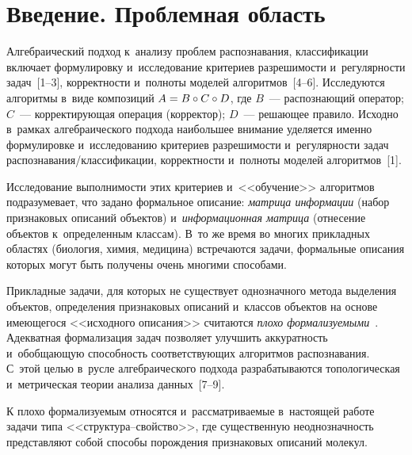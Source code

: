 \thispagestyle{headings}

\begin{multicols}{2}

\label{st\stat}
      
\section{Введение. Проблемная область}

     Алгебраический подход к~анализу проблем распознавания, 
классификации включает формулировку и~исследование критериев 
разрешимости и~регулярности задач~[1--3], корректности и~полноты моделей 
алгоритмов~[4--6]. Исследуются алгоритмы в~виде композиций 
$A\hm= {B}\circ {C}\circ {D}$, где 
${B}$~--- распознающий оператор; ${C}$~--- кор\-рек\-ти\-ру\-ющая 
операция (корректор); ${D}$~--- решающее правило. Исходно в~рамках 
алгебраического подхода наибольшее внимание уделяется именно 
формулировке и~исследованию критериев разрешимости и~регулярности задач 
рас\-по\-зна\-ва\-ния/клас\-си\-фи\-ка\-ции, корректности и~полноты моделей 
алгоритмов~[1]. 
     
     Исследование выполнимости этих критериев и~<<обучение>> алгоритмов 
подразумевает, что задано формальное описание: \textit{матрица информации} 
(набор признаковых описаний объектов) и~\textit{информационная матрица} 
(отнесение объектов к~определенным классам). В~то же время во многих 
прикладных областях (биология, химия, медицина) встречаются задачи, 
формальные описания которых могут быть получены очень многими 
спо\-со\-бами. 
{ %

}

     
     Прикладные задачи, для которых не существует однозначного метода 
выделения объектов, определения признаковых описаний и~классов объектов на 
основе имеющегося <<исходного описания>> считаются \textit{плохо 
формализуемыми}~\cite{6-tr}. Адекватная формализация задач позволяет 
улучшить аккуратность и~обобщающую способность со\-от\-вет\-ст\-ву\-ющих 
алгоритмов распознавания. С~этой целью в~русле алгебраического подхода 
разрабатываются топологическая и~метрическая тео\-рии анализа данных~[\mbox{7--9}].
{

} 
     
     К плохо формализуемым относятся и~рас\-смат\-ри\-ва\-емые в~настоящей 
работе задачи типа <<струк\-ту\-ра--свой\-ст\-во>>, где существенную 
неоднозначность представляют собой способы порождения признаковых 
описаний молекул. 


\end{multicols}
